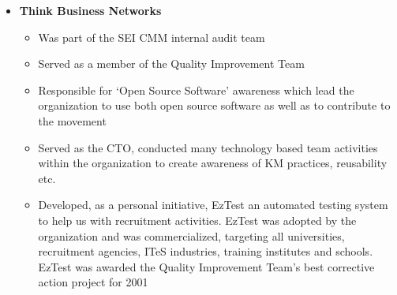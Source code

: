 \documentclass[a4paper,11pt]{article}
\begin{document}
\begin{itemize}
\begin{itemize}
\begin{itemize}
      \item \textbf{Patent Reviewer} to streamline and be the first
        line of reviewing the patent applications by the team and
        guiding them to represent their ideas better. Improved
        selection rate next level by 70\%

      \end{itemize}
      
    \end{itemize}

  \item{\textbf{Think Business Networks}}

    \begin{itemize}
      
      \setlength\itemsep{-0.5em}
      
      \item Was part of the SEI CMM internal audit team 

      \item Served as a member of the Quality Improvement Team 

      \item Responsible for `Open Source Software' awareness which 
        lead the organization to use both open source software as well
        as to contribute to the movement

      \item Served as the CTO, conducted many technology based team
        activities within the organization to create awareness of KM
        practices, reusability etc.

      \item Developed, as a personal initiative, EzTest an automated
        testing system to help us with recruitment activities. EzTest
        was adopted by the organization and was commercialized,
        targeting all universities, recruitment agencies, ITeS
        industries, training institutes and schools. EzTest was
        awarded the Quality Improvement Team's best corrective action
        project for 2001
        
    \end{itemize}
\end{itemize}
\end{document}
